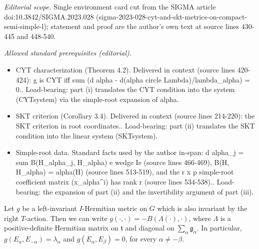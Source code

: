 \documentclass[10pt,a4paper]{article}
\numberwithin{equation}{section}
\theoremstyle{definition}
\begin{document}
\noindent\textit{Editorial scope.} Single environment card cut from the SIGMA article doi:10.3842/SIGMA.2023.028 (sigma-2023-028-cyt-and-skt-metrics-on-compact-semi-simple-l); statement and proof are the author's own text at source lines 430-445 and 448-540.\par\medskip
\noindent\textit{Allowed standard prerequisites (editorial).}\begin{itemize}
\item CYT characterization (Theorem 4.2). Delivered in context (source lines 420-424): g is CYT iff sum (d alpha - d(alpha circle Lambda)/lambda\_alpha) = 0.. Load-bearing: part (i) translates the CYT condition into the system (CYTsystem) via the simple-root expansion of alpha.
\item SKT criterion (Corollary 3.4). Delivered in context (source lines 214-220): the SKT criterion in root coordinates.. Load-bearing: part (ii) translates the SKT condition into the linear system (SKTsystem).
\item Simple-root data. Standard facts used by the author in-span: d alpha\_j = sum B(H\_alpha\_j, H\_alpha) e wedge Ie (source lines 466-469), B(H, H\_alpha) = alpha(H) (source lines 513-519), and the r x p simple-root coefficient matrix (x\_alpha\textasciicircum{}i) has rank r (source lines 534-538).. Load-bearing: the expansion of part (ii) and the invertibility argument of part (iii).
\end{itemize}\medskip
Let $g$ be a left-invariant $I$-Hermitian metric on $G$ which is also invariant by the right $T$-action. Then we can write $g (\cdot, \cdot ) = -B (\Lambda (\cdot), \cdot)$, where
$\Lambda$ is a positive-definite Hermitian matrix on $\mathfrak t$ and diagonal on $\sum_{\alpha} \mathfrak g_{\alpha}$.
In particular, $g (E_{\alpha}, E_{-\alpha}) = \lambda_{\alpha}$ and $g(E_{\alpha},E_{\beta}) =0$, for every $\alpha \neq - \beta$.
\end{document}
